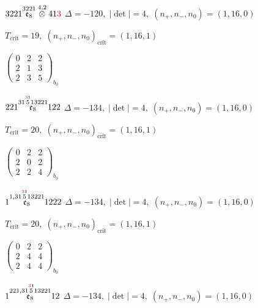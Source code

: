 \documentclass[10pt]{article}
\begin{document}
\smallskip

$3221\overset{3221}{\mathfrak{e}_8}\overset{4,2}{\otimes}41\textcolor{red}{3}$ \quad $\Delta=-120,\; |\det|=4,\; (n_+,n_-,n_0)=(1,16,0)$

\hspace{1em}$T_{\text{crit}}=19,\; (n_+,n_-,n_0)_{\text{crit}}=(1,16,1)$

\hspace{2em}$\left(\begin{smallmatrix}0 & 2 & 2 \\ 2 & 1 & 3 \\ 2 & 3 & 5\end{smallmatrix}\right)_{\!b_0}$

\smallskip

$221\overset{31\overset{\textcolor{red}{3}1}{5}13221}{\mathfrak{e}_8}122$ \quad $\Delta=-134,\; |\det|=4,\; (n_+,n_-,n_0)=(1,16,0)$

\hspace{1em}$T_{\text{crit}}=20,\; (n_+,n_-,n_0)_{\text{crit}}=(1,16,1)$

\hspace{2em}$\left(\begin{smallmatrix}0 & 2 & 2 \\ 2 & 0 & 2 \\ 2 & 2 & 4\end{smallmatrix}\right)_{\!b_0}$

\smallskip

$1\overset{1,31\overset{\textcolor{red}{3}1}{5}13221}{\mathfrak{e}_8}1222$ \quad $\Delta=-134,\; |\det|=4,\; (n_+,n_-,n_0)=(1,16,0)$

\hspace{1em}$T_{\text{crit}}=20,\; (n_+,n_-,n_0)_{\text{crit}}=(1,16,1)$

\hspace{2em}$\left(\begin{smallmatrix}0 & 2 & 2 \\ 2 & 4 & 4 \\ 2 & 4 & 4\end{smallmatrix}\right)_{\!b_0}$

\smallskip

$1\overset{221,31\overset{\textcolor{red}{3}1}{5}13221}{\mathfrak{e}_8}12$ \quad $\Delta=-134,\; |\det|=4,\; (n_+,n_-,n_0)=(1,16,0)$
\end{document}
